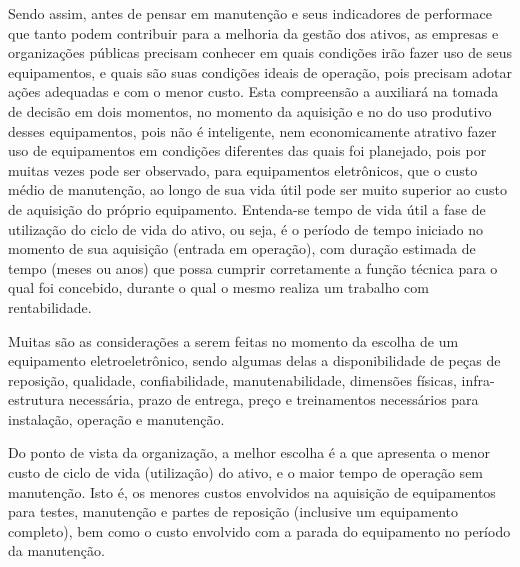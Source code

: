 Sendo assim, antes de pensar em manutenção e seus indicadores de performace que tanto podem contribuir para a melhoria da gestão dos ativos, as empresas e organizações públicas precisam conhecer em quais condições irão fazer uso de seus equipamentos, e quais são suas condições ideais de operação, pois precisam adotar ações adequadas e com o menor custo. Esta compreensão a auxiliará na tomada de decisão em dois momentos, no momento da aquisição e no do uso produtivo desses equipamentos, pois não é inteligente, nem economicamente atrativo fazer uso de equipamentos em condições diferentes das quais foi planejado, pois por muitas vezes pode ser observado, para equipamentos eletrônicos, que o custo médio de manutenção, ao longo de sua vida útil pode ser muito superior ao custo de aquisição do próprio equipamento. Entenda-se tempo de vida útil a fase de utilização do ciclo de vida do ativo, ou seja, é o período de tempo iniciado no momento de sua aquisição (entrada em operação), com duração estimada de tempo (meses ou anos) que possa cumprir corretamente a função técnica para o qual foi concebido, durante o qual o mesmo realiza um trabalho com rentabilidade. 

Muitas são as considerações a serem feitas no momento da escolha de um equipamento eletroeletrônico, sendo algumas delas a disponibilidade de peças de reposição, qualidade, confiabilidade, manutenabilidade, dimensões físicas, infra-estrutura necessária, prazo de entrega, preço e treinamentos necessários para instalação, operação e manutenção. 

Do ponto de vista da organização, a melhor escolha é a que apresenta o menor custo de ciclo de vida (utilização) do ativo, e o maior tempo de operação sem manutenção. Isto é, os menores custos envolvidos na aquisição de equipamentos para testes, manutenção e partes de reposição (inclusive um equipamento completo), bem como o custo envolvido com a parada do equipamento no período da manutenção.


